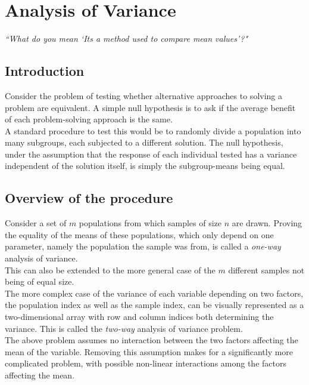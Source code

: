 \chapter{Analysis of Variance}


\begin{flushright}
	\textit{``What do you mean `Its a method used to compare mean values'?"} \\
\end{flushright}

\section{Introduction}

Consider the problem of testing whether alternative approaches to solving a problem are equivalent. A simple null hypothesis is to ask if the average benefit of each problem-solving approach is the same. \\
	
A standard procedure to test this would be to randomly divide a population into many subgroups, each subjected to a different solution. The null hypothesis, under the assumption that the response of each individual tested has a variance independent of the solution itself, is simply the subgroup-means being equal.\\

\section{Overview of the procedure}

Consider a set of $ m $ populations from which samples of size $ n $ are drawn. Proving the equality of the means of these populations, which only depend on one parameter, namely the population the sample was from, is called a \textit{one-way} analysis of variance. \\

This can also be extended to the more general case of the $ m $ different samples not being of equal size. \\

The more complex case of the variance of each variable depending on two factors, the population index as well as the sample index, can be visually represented as a two-dimensional array with row and column indices both determining the variance. This is called the \textit{two-way} analysis of variance problem. \\

The above problem assumes no interaction between the two factors affecting the mean of the variable. Removing this assumption makes for a significantly more complicated problem, with possible non-linear interactions among the factors affecting the mean.\\

